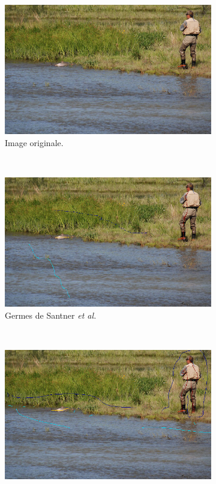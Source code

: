 \begin{figure}[htb]
 \centering
 \begin{subfigure}[t]{0.4\textwidth}	
\includegraphics[width=\textwidth]{images/evaluation/SeedsSantner/image_0011_9060}
\caption{Image originale.}
 \end{subfigure}
 \\
 \begin{subfigure}[t]{0.4\textwidth}
\includegraphics[width=\textwidth]{images/evaluation/SeedsSantner/image_0011_9060_seeds_santner}
\caption{Germes de Santner \textit{et al.}}
 \end{subfigure}
 ~
 \begin{subfigure}[t]{0.4\textwidth}
\includegraphics[width=\textwidth]{images/evaluation/SeedsSantner/image_0011_9060_seeds_saf}

\end{subfigure}
\end{figure}
